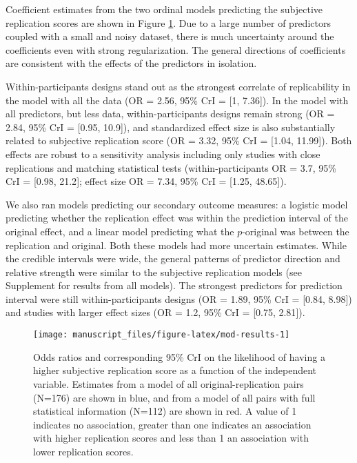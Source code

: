 \documentclass[
  english,
  a4paper,
]{article}
\begin{document}
Coefficient estimates from the two ordinal models predicting the subjective replication scores are shown in Figure \ref{fig:mod-results}. Due to a large number of predictors coupled with a small and noisy dataset, there is much uncertainty around the coefficients even with strong regularization. The general directions of coefficients are consistent with the effects of the predictors in isolation.

Within-participants designs stand out as the strongest correlate of replicability in the model with all the data (OR = 2.56, 95\% CrI = {[}1, 7.36{]}). In the model with all predictors, but less data, within-participants designs remain strong (OR = 2.84, 95\% CrI = {[}0.95, 10.9{]}), and standardized effect size is also substantially related to subjective replication score (OR = 3.32, 95\% CrI = {[}1.04, 11.99{]}). Both effects are robust to a sensitivity analysis including only studies with close replications and matching statistical tests (within-participants OR = 3.7, 95\% CrI = {[}0.98, 21.2{]}; effect size OR = 7.34, 95\% CrI = {[}1.25, 48.65{]}).

We also ran models predicting our secondary outcome measures: a logistic model predicting whether the replication effect was within the prediction interval of the original effect, and a linear model predicting what the \(p\)-original was between the replication and original. Both these models had more uncertain estimates. While the credible intervals were wide, the general patterns of predictor direction and relative strength were similar to the subjective replication models (see Supplement for results from all models). The strongest predictors for prediction interval were still within-participants designs (OR = 1.89, 95\% CrI = {[}0.84, 8.98{]}) and studies with larger effect sizes (OR = 1.2, 95\% CrI = {[}0.75, 2.81{]}).

\begin{figure}[ht]
\texttt{[image: manuscript\_files/figure-latex/mod-results-1]} \caption{Odds ratios and corresponding 95\% CrI on the likelihood of having a higher subjective replication score as a function of the independent variable. Estimates from a model of all original-replication pairs (N=176) are shown in blue, and from a model of all pairs with full statistical information (N=112) are shown in red. A value of 1 indicates no association, greater than one indicates an association with higher replication scores and less than 1 an association with lower replication scores.}\label{fig:mod-results}
\end{figure}
\end{document}
